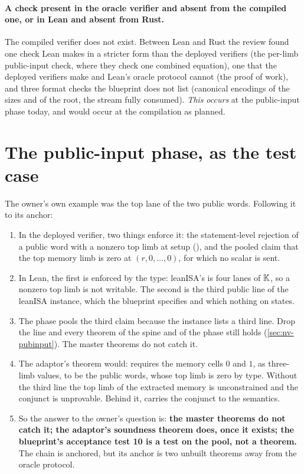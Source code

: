 \paragraph{A check present in the oracle verifier and absent from the compiled one, or in Lean
and absent from Rust.} The compiled verifier does not exist. Between Lean and Rust the review
found one check Lean makes in a stricter form than the deployed verifiers (the per-limb
public-input check, where they check one combined equation), one that the deployed verifiers make and Lean's oracle protocol cannot (the proof of
work), and three format checks the blueprint does not list (canonical encodings of the sizes
and of the root, the stream fully consumed). \emph{This occurs} at the public-input phase
today, and would occur at the compilation as planned.

\section{The public-input phase, as the test case}\label{sec:drift-pubinput}

The owner's own example was the top lane of the two public words. Following it to its anchor:

\begin{enumerate}
\item In the deployed verifier, two things enforce it: the statement-level rejection of a
  public word with a nonzero top limb at setup (), and the pooled claim
  that the top memory limb is zero at $(r, 0, \dots, 0)$, for which no scalar is sent.
\item In Lean, the first is enforced by the type: leanISA's  is four lanes of
  $\mathbb{K}$, so a nonzero top limb is not writable. The second is the third public line of the
  leanISA instance, which the blueprint specifies and which nothing on  states.
\item The phase pools the third claim because the instance lists a third line. Drop the line
  and every theorem of the spine and of the phase still holds (\cref{sec:nv-pubinput}). The
  master theorems do not catch it.
\item The adaptor's theorem  would:  requires
  the memory cells $0$ and $1$, as three-limb values, to be the public words, whose top limb is
  zero by type. Without the third line the top limb of the extracted memory is unconstrained
  and the conjunct is unprovable. Behind it,  carries the conjunct to
  the semantics.
\item So the answer to the owner's question is: \textbf{the master theorems do not catch it;
  the adaptor's soundness theorem does, once it exists; the blueprint's acceptance test 10 is a
  test on the pool, not a theorem.} The chain is anchored, but its anchor is two unbuilt
  theorems away from the oracle protocol.
\end{enumerate}

